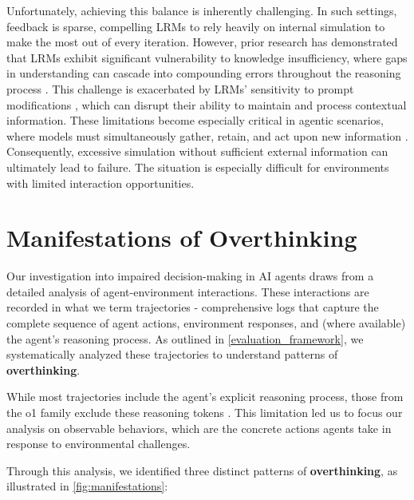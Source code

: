 Unfortunately, achieving this balance is inherently challenging. In such settings, feedback is sparse, compelling LRMs to rely heavily on internal simulation to make the most out of every iteration. However, prior research has demonstrated that LRMs exhibit significant vulnerability to knowledge insufficiency, where gaps in understanding can cascade into compounding errors throughout the reasoning process \cite{li2025searcho1agenticsearchenhancedlarge, zhong2024evaluationopenaio1opportunities, LingFLHLMS23, chia2024reasoningpathsoptimizationlearning}. This challenge is exacerbated by LRMs' sensitivity to prompt modifications \cite{openai_learning_to_reason_2024, deepseekai2025deepseekr1incentivizingreasoningcapability}, which can disrupt their ability to maintain and process contextual information. These limitations become especially critical in agentic scenarios, where models must simultaneously gather, retain, and act upon new information \cite{zhang2024agenticinformationretrieval, yang2024sweagentagentcomputerinterfacesenable}. Consequently, excessive simulation without sufficient external information can ultimately lead to failure. The situation is especially difficult for environments with limited interaction opportunities.

\section{Manifestations of Overthinking}
\label{sec:manifestations_detailed}

Our investigation into impaired decision-making in AI agents draws from a detailed analysis of agent-environment interactions. These interactions are recorded in what we term trajectories - comprehensive logs that capture the complete sequence of agent actions, environment responses, and (where available) the agent's reasoning process. As outlined in \cref{evaluation_framework}, we systematically analyzed these trajectories to understand patterns of \textbf{overthinking}.

While most trajectories include the agent's explicit reasoning process, those from the o1 family exclude these reasoning tokens \cite{openai_learning_to_reason_2024}. This limitation led us to focus our analysis on observable behaviors, which are the concrete actions agents take in response to environmental challenges.

Through this analysis, we identified three distinct patterns of \textbf{overthinking}, as illustrated in \cref{fig:manifestations}:


